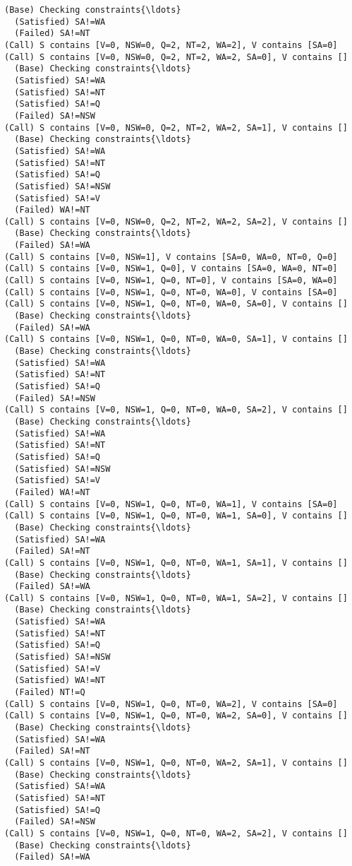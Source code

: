 \documentclass[11pt]{article}
\begin{document}
\begin{Verbatim}[commandchars=\\\{\}]
  (Base) Checking constraints{\ldots}
  (Satisfied) SA!=WA
  (Failed) SA!=NT
(Call) S contains [V=0, NSW=0, Q=2, NT=2, WA=2], V contains [SA=0]
(Call) S contains [V=0, NSW=0, Q=2, NT=2, WA=2, SA=0], V contains []
  (Base) Checking constraints{\ldots}
  (Satisfied) SA!=WA
  (Satisfied) SA!=NT
  (Satisfied) SA!=Q
  (Failed) SA!=NSW
(Call) S contains [V=0, NSW=0, Q=2, NT=2, WA=2, SA=1], V contains []
  (Base) Checking constraints{\ldots}
  (Satisfied) SA!=WA
  (Satisfied) SA!=NT
  (Satisfied) SA!=Q
  (Satisfied) SA!=NSW
  (Satisfied) SA!=V
  (Failed) WA!=NT
(Call) S contains [V=0, NSW=0, Q=2, NT=2, WA=2, SA=2], V contains []
  (Base) Checking constraints{\ldots}
  (Failed) SA!=WA
(Call) S contains [V=0, NSW=1], V contains [SA=0, WA=0, NT=0, Q=0]
(Call) S contains [V=0, NSW=1, Q=0], V contains [SA=0, WA=0, NT=0]
(Call) S contains [V=0, NSW=1, Q=0, NT=0], V contains [SA=0, WA=0]
(Call) S contains [V=0, NSW=1, Q=0, NT=0, WA=0], V contains [SA=0]
(Call) S contains [V=0, NSW=1, Q=0, NT=0, WA=0, SA=0], V contains []
  (Base) Checking constraints{\ldots}
  (Failed) SA!=WA
(Call) S contains [V=0, NSW=1, Q=0, NT=0, WA=0, SA=1], V contains []
  (Base) Checking constraints{\ldots}
  (Satisfied) SA!=WA
  (Satisfied) SA!=NT
  (Satisfied) SA!=Q
  (Failed) SA!=NSW
(Call) S contains [V=0, NSW=1, Q=0, NT=0, WA=0, SA=2], V contains []
  (Base) Checking constraints{\ldots}
  (Satisfied) SA!=WA
  (Satisfied) SA!=NT
  (Satisfied) SA!=Q
  (Satisfied) SA!=NSW
  (Satisfied) SA!=V
  (Failed) WA!=NT
(Call) S contains [V=0, NSW=1, Q=0, NT=0, WA=1], V contains [SA=0]
(Call) S contains [V=0, NSW=1, Q=0, NT=0, WA=1, SA=0], V contains []
  (Base) Checking constraints{\ldots}
  (Satisfied) SA!=WA
  (Failed) SA!=NT
(Call) S contains [V=0, NSW=1, Q=0, NT=0, WA=1, SA=1], V contains []
  (Base) Checking constraints{\ldots}
  (Failed) SA!=WA
(Call) S contains [V=0, NSW=1, Q=0, NT=0, WA=1, SA=2], V contains []
  (Base) Checking constraints{\ldots}
  (Satisfied) SA!=WA
  (Satisfied) SA!=NT
  (Satisfied) SA!=Q
  (Satisfied) SA!=NSW
  (Satisfied) SA!=V
  (Satisfied) WA!=NT
  (Failed) NT!=Q
(Call) S contains [V=0, NSW=1, Q=0, NT=0, WA=2], V contains [SA=0]
(Call) S contains [V=0, NSW=1, Q=0, NT=0, WA=2, SA=0], V contains []
  (Base) Checking constraints{\ldots}
  (Satisfied) SA!=WA
  (Failed) SA!=NT
(Call) S contains [V=0, NSW=1, Q=0, NT=0, WA=2, SA=1], V contains []
  (Base) Checking constraints{\ldots}
  (Satisfied) SA!=WA
  (Satisfied) SA!=NT
  (Satisfied) SA!=Q
  (Failed) SA!=NSW
(Call) S contains [V=0, NSW=1, Q=0, NT=0, WA=2, SA=2], V contains []
  (Base) Checking constraints{\ldots}
  (Failed) SA!=WA

\end{Verbatim}
\end{document}
